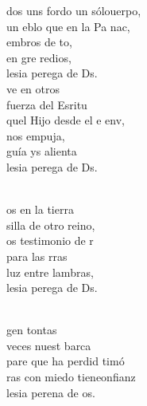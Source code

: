 \documentclass[12pt]{article}
\begin{document}
\begin{multicols*}{2}
\begin{cancion}%
	dos uns fordo un sólouerpo,\\
	un eblo que en la Pa nac,\\
	embros de to,\\
	en gre redios,\\
	lesia perega de Ds.\\
\jump
	ve en otros\\
	fuerza del Esritu \\
	quel Hijo desde el e env,\\
	 nos empuja,\\
	guía ys alienta\\
	lesia perega de Ds.\\\jump\\
	\begin{chorus}%
	os en la tierra \\
	silla de otro reino,\\
	os testimonio de r\\
	 para las rras\\
	luz entre lambras,\\
	lesia perega de Ds.\\
	\end{chorus}%
	\jump\\
	gen tontas \\
	 veces nuest barca\\
	pare que ha perdid timó\\
	ras con miedo tieneonfianz\\
	lesia perena de os.\\

\end{cancion}
\end{multicols*}
\end{document}
